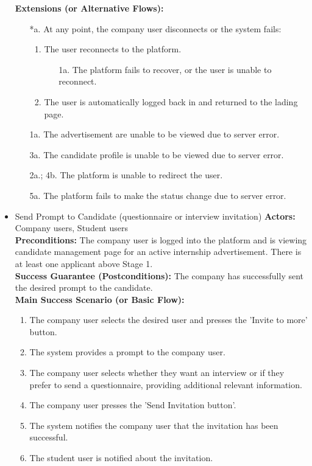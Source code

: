 \begin{itemize}[label={[\textbf{UC}]}, align=left, leftmargin=*]
    \textbf{Extensions (or Alternative Flows):} 
    \begin{enumerate}[label=\arabic*.]
        \item[*a.] At any point, the company user disconnects or the system fails:
            \begin{enumerate}[label=\arabic*.]
                \item The user reconnects to the platform.
                    \begin{enumerate}[label=\alph*.]
                        \item[1a.] The platform fails to recover, or the user is unable to reconnect.
                    \end{enumerate}
                 \item The user is automatically logged back in and returned to the lading page.
            \end{enumerate}
        \item[1a.] The advertisement are unable to be viewed due to server error. 
        \item[3a.] The candidate profile is unable to be viewed due to server error. 
        \item[2a.; 4b.] The platform is unable to redirect the user.
        \item[5a.] The platform fails to make the status change due to server error.
        \end{enumerate}


    \item {} Send Prompt to Candidate (questionnaire or interview invitation)
    \textbf{Actors:} Company users, Student users\\
     \textbf{Preconditions:} The company user is logged into the platform and is viewing candidate management page for an active internship advertisement. There is at least one applicant above Stage 1.\\
     \textbf{Success Guarantee (Postconditions):} The company has successfully sent the desired prompt to the candidate. \\
     \textbf{Main Success Scenario (or Basic Flow):} 
     \begin{enumerate}[label=\arabic*.] 
        \item The company user selects the desired user and presses the 'Invite to more' button.
        \item The system provides a prompt to the company user.
        \item The company user selects whether they want an interview or if they prefer to send a questionnaire, providing additional relevant information.
        \item The company user presses the 'Send Invitation button'.
        \item The system notifies the company user that the invitation has been successful.
        \item The student user is notified about the invitation.
     \end{enumerate} \\


\end{itemize}
